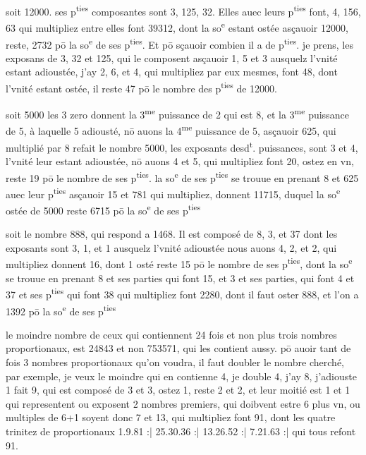 \documentclass[11pt,a4paper]{article}
\begin{document}
soit 12000. ses p\textsuperscript{ties} composantes sont 3, 125, 32. Elles auec leurs p\textsuperscript{ties} font, 4, 156, 63 qui multipliez entre elles font 39312, dont la so\textsuperscript{e} estant ostée asçauoir 12000, reste, 2732 pō la so\textsuperscript{e} de ses p\textsuperscript{ties}. Et pō sçauoir combien il a de p\textsuperscript{ties}. je prens, les exposans de 3, 32 et 125, qui le composent asçauoir 1, 5 et 3 ausquelz l'vnité estant adioustée, j'ay 2, 6, et 4, qui multipliez par eux mesmes, font 48, dont l'vnité estant ostée, il reste 47 pō le nombre des p\textsuperscript{ties} de 12000.

soit 5000 les 3 zero donnent la 3\textsuperscript{me} puissance de 2 qui est 8, et la 3\textsuperscript{me} puissance de 5, à laquelle 5 adiousté, nō auons la 4\textsuperscript{me} puissance de 5, asçauoir 625, qui multiplié par 8 refait le nombre 5000, les exposants desd\textsuperscript{t}. puissances, sont 3 et 4, l'vnité leur estant adioustée, nō auons 4 et 5, qui multipliez font 20, ostez en vn, reste 19 pō le nombre de ses p\textsuperscript{ties}. la so\textsuperscript{e} de ses p\textsuperscript{ties} se trouue en prenant 8 et 625 auec leur p\textsuperscript{ties} asçauoir 15 et 781 qui multipliez, donnent 11715, duquel la so\textsuperscript{e} ostée de 5000 reste 6715 pō la so\textsuperscript{e} de ses p\textsuperscript{ties}

soit le nombre 888, qui respond a 1468. Il est composé de 8, 3, et 37 dont les exposants sont 3, 1, et 1 ausquelz l'vnité adioustée nous auons 4, 2, et 2, qui multipliez donnent 16, dont 1 osté reste 15 pō le nombre de ses p\textsuperscript{ties}, dont la so\textsuperscript{e} se trouue en prenant 8 et ses parties qui font 15, et 3 et ses parties, qui font 4 et 37 et ses p\textsuperscript{ties} qui font 38 qui multipliez font 2280, dont il faut oster 888, et l'on a 1392 pō la so\textsuperscript{e} de ses p\textsuperscript{ties}

le moindre nombre de ceux qui contiennent 24 fois et non plus trois nombres proportionaux, est 24843 et non 753571, qui les contient aussy. pō auoir tant de fois 3 nombres proportionaux qu'on voudra, il faut doubler le nombre cherché, par exemple, je veux le moindre qui en contienne 4, je double 4, j'ay 8, j'adiouste 1 fait 9, qui est composé de 3 et 3, ostez 1, reste 2 et 2, et leur moitié est 1 et 1 qui representent ou exposent 2 nombres premiers, qui doibvent estre 6 plus vn, ou multiples de 6+1 soyent donc 7 et 13, qui multipliez font 91, dont les quatre trinitez de proportionaux 1.9.81 :| 25.30.36 :| 13.26.52 :| 7.21.63 :| qui tous refont 91.
\end{document}
